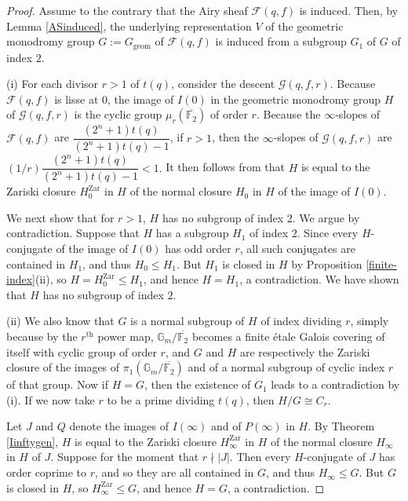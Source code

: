 \documentclass[11pt]{amsart}
\theoremstyle{plain}
\theoremstyle{definition}
\numberwithin{thm}{section}
\numberwithin{equation}{thm}
\newcommand{\sF}{{\mathcal F}}
\newcommand{\sG}{{\mathcal G}}
\newcommand{\F}{{\mathbb F}}
\newcommand{\G}{{\mathbb G}}
\newcommand{\0}{\emptyset}
\newcommand{\geo}{{\mathrm {geom}}}
\begin{document}
\begin{proof}
Assume to the contrary that the Airy sheaf $\sF(q,f)$ is induced. Then, by Lemma \ref{ASinduced}, the underlying representation
$V$ of the geometric monodromy group $G:=G_{\geo}$ of $\sF(q,f)$ is induced from a subgroup $G_1$ of $G$ of
index $2$.

\smallskip
(i) For each divisor $r > 1$ of $t(q)$, consider the descent $\sG(q,f,r)$. Because $\sF(q,f)$ is lisse at $0$, 
the image of $I(0)$ in the geometric monodromy group $H$ of $\sG(q,f,r)$ is the cyclic group $\mu_r(\overline{\F_2})$ of order $r$. 
Because the $\infty$-slopes of $\sF(q,f)$ are $\dfrac{(2^n+1)t(q)}{(2^n+1)t(q) -1}$, if $r >1$, then the $\infty$-slopes of $\sG(q,f,r)$ are
 $(1/r) \dfrac{(2^n+1)t(q)}{(2^n+1)t(q) -1} <1.$ It then follows from \cite[Proposition 4.2]{KT5} that
$H$ is equal to the Zariski closure $H_0^{{\mathrm{Zar}}}$ in $H$ of the normal closure $H_0$ in $H$ of the image of $I(0)$. 

\smallskip
We next show that for $r >1$, $H$ has no subgroup of index $2$. We argue by contradiction. Suppose
that $H$ has a subgroup $H_1$ of index $2$. Since every $H$-conjugate of the image of $I(0)$ has odd order $r$,
all such conjugates are contained in $H_1$, and thus $H_0 \leq H_1$. But $H_1$ is closed in $H$ by Proposition \ref{finite-index}(ii),
so $H=H_0^{{\mathrm{Zar}}} \leq H_1$, and hence $H=H_1$, a contradiction. We have shown that $H$ has no subgroup of index $2$.

\smallskip
(ii) We also know that $G$ is a normal subgroup of $H$ of index dividing $r$, simply because by the $r^{\mathrm {th}}$ power map, $\G_m/\overline{\F_2}$ becomes a finite \'etale Galois covering of itself with cyclic group of order $r$, and $G$ and $H$ are respectively the Zariski closure of the images of $\pi_1(\G_m/\overline{\F_2})$ and of a normal subgroup of cyclic index $r$ of that group. Now if $H=G$, then the existence of
$G_1$ leads to a contradiction by (i). If we now take $r$ to be a prime dividing $t(q)$, 
then $H/G \cong C_r$. 

Let $J$ and $Q$ denote the images of $I(\infty)$ and of $P(\infty)$ in $H$.  By Theorem \ref{Iinftygen}, $H$ is equal to the Zariski closure $H_{\infty}^{{\mathrm{Zar}}}$ in $H$ of the normal closure $H_\infty$ in $H$ of $J$. Suppose for the moment that $r \nmid |J|$. Then every $H$-conjugate of $J$ has order 
coprime to $r$, and so they are all contained in $G$, and thus $H_{\infty} \leq G$. But $G$ is closed in $H$, so
$H_\infty^{{\mathrm{Zar}}} \leq G$, and hence $H=G$, a contradiction.   


\end{proof}
\end{document}
